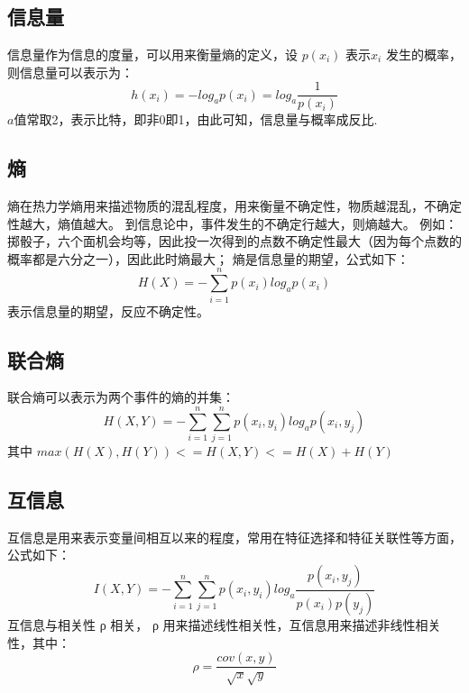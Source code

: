 \documentclass[UTF8]{ctexart}
\begin{document}
    \section{} 
    \subsection{信息量}
    信息量作为信息的度量，可以用来衡量熵的定义，设 $p(x_i)$ 表示$x_i$ 发生的概率，则信息量可以表示为：
     \begin{equation}
      h(x_i) = −log_{a}p(x_i) = log_{a}\frac{1}{p(x_i)}
     \end{equation}
    $a$值常取2，表示比特，即非0即1，由此可知，信息量与概率成反比.

    \subsection{熵} 
    熵在热力学熵用来描述物质的混乱程度，用来衡量不确定性，物质越混乱，不确定性越大，熵值越大。
    到信息论中，事件发生的不确定行越大，则熵越大。
    例如：掷骰子，六个面机会均等，因此投一次得到的点数不确定性最大（因为每个点数的概率都是六分之一），因此此时熵最大；
    熵是信息量的期望，公式如下：
    \begin{equation}
    H(X) = -\sum^n_{i=1}p(x_i)log_{a}p(x_i)
    \end{equation}
    表示信息量的期望，反应不确定性。

    \subsection{联合熵}
    联合熵可以表示为两个事件的熵的并集：
    \begin{equation}
    H(X, Y) = -\sum^n_{i=1}\sum^n_{j=1}p(x_i, y_i)log_{a}p(x_i, y_j)
    \end{equation}
    其中  $max(H(X), H(Y)) <= H(X, Y) <= H(X) + H(Y)$

    \subsection{互信息}
    互信息是用来表示变量间相互以来的程度，常用在特征选择和特征关联性等方面，公式如下：
    \begin{equation}
    I(X, Y) = -\sum^n_{i=1}\sum^n_{j=1}p(x_i, y_i)log_{a}\frac{p(x_i, y_j)}{p(x_i)p(y_j)}
    \end{equation}
    互信息与相关性 ρ 相关， ρ 用来描述线性相关性，互信息用来描述非线性相关性，其中：
    \begin{equation}
    \rho = \frac{cov(x,y)}{\sqrt{x}\sqrt{y}}
    \end{equation}
\end{document}
